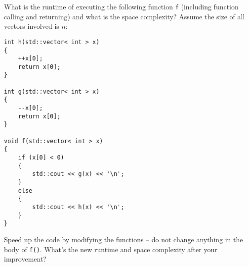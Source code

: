 What is the runtime of executing the following function \verb!f! (including
function calling and returning)
and what is the space complexity?
Assume the size of all vectors involved is $n$:
\begin{Verbatim}[frame=single,fontsize=\small]
int h(std::vector< int > x)
{
    ++x[0];
    return x[0];
}

int g(std::vector< int > x)
{
    --x[0];
    return x[0];
}

void f(std::vector< int > x)
{
    if (x[0] < 0)
    {
        std::cout << g(x) << '\n';
    }
    else
    {
        std::cout << h(x) << '\n';
    }
}
\end{Verbatim}
Speed up the code by modifying the functions -- do not change anything
in the body of \verb!f()!.
What's the new runtime and space complexity after your improvement?

